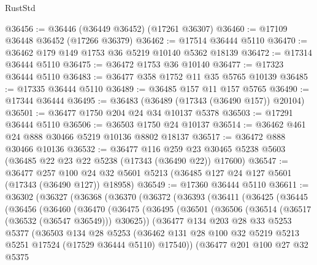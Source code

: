 \begin{lexlean}{RustStd}
\begin{coremodule}
@36456 := @36446 (@36449 @36452) (@17261 @36307)
@36460 := @17109 @36448 @36452 (@17266 @36379)
@36462 := @17514 @36444 @5110
@36470 := @36462 @179 @149 @1753 @36 @5219 @10140 @5362 @18139
@36472 := @17314 @36444 @5110
@36475 := @36472 @1753 @36 @10140
@36477 := @17323 @36444 @5110
@36483 := @36477 @358 @1752 @11 @35 @5765 @10139
@36485 := @17335 @36444 @5110
@36489 := @36485 @157 @11 @157 @5765
@36490 := @17344 @36444
@36495 := @36483 (@36489 (@17343 (@36490 @157)) @20104)
@36501 := @36477 @1750 @204 @24 @34 @10137 @5378
@36503 := @17291 @36444 @5110
@36506 := @36503 @1750 @24 @10137
@36514 := @36462 @461 @24 @888 @30466 @5219 @10136 @8802 @18137
@36517 := @36472 @888 @30466 @10136
@36532 := @36477
    @116
    @259
    @23
    @30465
    @5238
    @5603
    (@36485 @22 @23 @22 @5238 (@17343 (@36490 @22)) @17600)
@36547 := @36477
    @257
    @100
    @24
    @32
    @5601
    @5213
    (@36485 @127 @24 @127 @5601 (@17343 (@36490 @127)) @18958)
@36549 := @17360 @36444 @5110
@36611 := @36302
    (@36327
      (@36368
        (@36370
          (@36372
            (@36393
              (@36411
                (@36425
                  (@36445
                    (@36456
                      (@36460
                        (@36470
                          (@36475
                            (@36495
                              (@36501
                                (@36506 (@36514 (@36517 (@36532 (@36547 @36549))) @30625))
                                (@36477
                                  @134
                                  @203
                                  @28
                                  @33
                                  @5253
                                  @5377
                                  (@36503
                                    @134
                                    @28
                                    @5253
                                    (@36462
                                      @131
                                      @28
                                      @100
                                      @32
                                      @5219
                                      @5213
                                      @5251
                                      @17524
                                      (@17529 @36444 @5110)
                                      @17540))
                                  (@36477
                                    @201
                                    @100
                                    @27
                                    @32
                                    @5375

\end{coremodule}
\end{lexlean}
